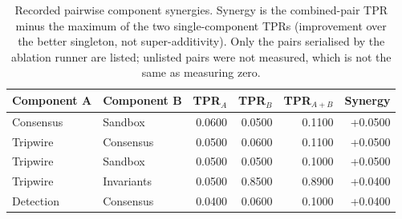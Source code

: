 \begin{table}[htbp]
\centering
\caption{Recorded pairwise component synergies. Synergy is the combined-pair TPR minus the maximum of the two single-component TPRs (improvement over the better singleton, not super-additivity). Only the pairs serialised by the ablation runner are listed; unlisted pairs were not measured, which is not the same as measuring zero.}
\label{tab:synergy}
\begin{tabular}{llrrrr}
\toprule
Component A & Component B & TPR$_A$ & TPR$_B$ & TPR$_{A+B}$ & Synergy \\
\midrule
Consensus & Sandbox & 0.0600 & 0.0500 & 0.1100 & +0.0500 \\
Tripwire & Consensus & 0.0500 & 0.0600 & 0.1100 & +0.0500 \\
Tripwire & Sandbox & 0.0500 & 0.0500 & 0.1000 & +0.0500 \\
Tripwire & Invariants & 0.0500 & 0.8500 & 0.8900 & +0.0400 \\
Detection & Consensus & 0.0400 & 0.0600 & 0.1000 & +0.0400 \\
\bottomrule
\end{tabular}
\end{table}